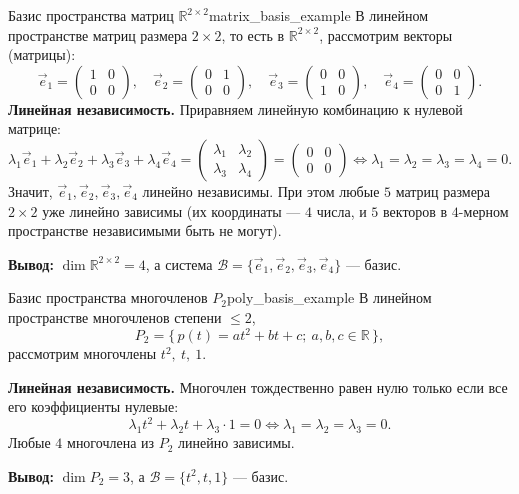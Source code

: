 \documentclass[12pt,a4paper]{article}
\begin{document}
\begin{definition}{Базис пространства матриц
  $\mathbb{R}^{2\times 2}$}{matrix_basis_example}
  В линейном пространстве матриц размера $2 \times 2$, то есть в
  $\mathbb{R}^{2\times 2}$, рассмотрим векторы (матрицы):
  \[
    \vec{e}_1 =
    \begin{pmatrix} 1 & 0 \\ 0 & 0
    \end{pmatrix}, \quad
    \vec{e}_2 =
    \begin{pmatrix} 0 & 1 \\ 0 & 0
    \end{pmatrix}, \quad
    \vec{e}_3 =
    \begin{pmatrix} 0 & 0 \\ 1 & 0
    \end{pmatrix}, \quad
    \vec{e}_4 =
    \begin{pmatrix} 0 & 0 \\ 0 & 1
    \end{pmatrix}.
  \]
  \textbf{Линейная независимость.} Приравняем линейную комбинацию к
  нулевой матрице:
  \[
    \lambda_1 \vec{e}_1 + \lambda_2 \vec{e}_2 + \lambda_3 \vec{e}_3 +
    \lambda_4 \vec{e}_4 =
    \begin{pmatrix} \lambda_1 & \lambda_2 \\ \lambda_3 & \lambda_4
    \end{pmatrix} =
    \begin{pmatrix} 0 & 0 \\ 0 & 0
    \end{pmatrix}
    \iff \lambda_1 = \lambda_2 = \lambda_3 = \lambda_4 = 0.
  \]
  Значит, $\vec{e}_1, \vec{e}_2, \vec{e}_3, \vec{e}_4$ линейно
  независимы. При этом любые $5$ матриц размера $2 \times 2$ уже линейно
  зависимы (их координаты --- $4$ числа, и $5$ векторов в $4$-мерном
  пространстве независимыми быть не могут).

  \medskip
  \textbf{Вывод:} $\dim \mathbb{R}^{2\times 2} = 4$, а система
  $\mathcal{B} = \{\vec{e}_1, \vec{e}_2, \vec{e}_3, \vec{e}_4\}$ ---
  базис.
\end{definition}

\begin{definition}{Базис пространства многочленов
  $P_2$}{poly_basis_example}
  В линейном пространстве многочленов степени $\le 2$,
  \[
    P_2 = \{\, p(t) = at^2 + bt + c; \ a, b, c \in \mathbb{R} \,\},
  \]
  рассмотрим многочлены $t^2,\ t,\ 1$.

  \textbf{Линейная независимость.} Многочлен тождественно равен нулю
  только если все его коэффициенты нулевые:
  \[
    \lambda_1 t^2 + \lambda_2 t + \lambda_3 \cdot 1 = 0
    \iff \lambda_1 = \lambda_2 = \lambda_3 = 0.
  \]
  Любые $4$ многочлена из $P_2$ линейно зависимы.

  \medskip
  \textbf{Вывод:} $\dim P_2 = 3$, а $\mathcal{B} = \{t^2, t, 1\}$ ---
  базис.
\end{definition}
\end{document}
